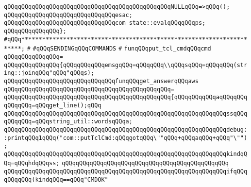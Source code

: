 \newline
\verb|qQQqqQQqqQQqqQQqqQQqqQQqqQQqqQQqqQQqqQQqqQQqqQQqNULLqQQq=>qQQq();|\newline
\newline
\verb|qQQqqQQqqQQqqQQqqQQqqQQqqQQqqQQqesac;|\newline
\newline
\verb|qQQqqQQqqQQqqQQqqQQqqQQqqQQqqQQqcom_state::evalqQQqqQQqps;|\newline
\verb|qQQqqQQqqQQqqQQq};|\newline
\newline
\newline
\verb|#qQQq**********************************************************************;|\newline
\verb|#|\newline
\verb|#qQQqSENDINGqQQqCOMMANDS|\newline
\verb|#|\newline
\newline
\newline
\newline
\verb|funqQQqput_tcl_cmdqQQqcmd|\newline
\verb|qQQqqQQqqQQqqQQq=|\newline
\verb|qQQqqQQqqQQqqQQq{qQQqqQQqqQQqemsgqQQq=qQQqqQQq\\qQQqsqQQq=qQQqqQQq(string::joinqQQq"qQQq"qQQqs);|\newline
\newline
\verb|qQQqqQQqqQQqqQQqqQQqqQQqqQQqqQQqfunqQQqget_answerqQQqaws|\newline
\verb|qQQqqQQqqQQqqQQqqQQqqQQqqQQqqQQqqQQqqQQqqQQqqQQq=|\newline
\verb|qQQqqQQqqQQqqQQqqQQqqQQqqQQqqQQqqQQqqQQqqQQqqQQq{qQQqqQQqqQQqaqQQqqQQqqQQqqQQq=qQQqget_line();qQQq|\newline
\verb|qQQqqQQqqQQqqQQqqQQqqQQqqQQqqQQqqQQqqQQqqQQqqQQqqQQqqQQqqQQqqQQqssqQQqqQQqqQQq=qQQqstring_util::wordsqQQqa;|\newline
\verb|qQQqqQQqqQQqqQQqqQQqqQQqqQQqqQQqqQQqqQQqqQQqqQQqqQQqqQQqqQQqqQQqdebug::printqQQq1qQQq("com::putTclCmd:qQQqgotqQQq\""qQQq+qQQqaqQQq+qQQq"\"");|\newline
\verb|qQQqqQQqqQQqqQQqqQQqqQQqqQQqqQQqqQQqqQQqqQQqqQQqqQQqqQQqqQQqqQQqkindqQQq=qQQqhdqQQqss;|\newline
\verb|qQQqqQQqqQQqqQQqqQQqqQQqqQQqqQQqqQQqqQQqqQQqqQQq|\newline
\verb|qQQqqQQqqQQqqQQqqQQqqQQqqQQqqQQqqQQqqQQqqQQqqQQqqQQqqQQqqQQqqQQqifqQQqqQQqqQQq(kindqQQq==qQQq"CMDOK"|\newline
